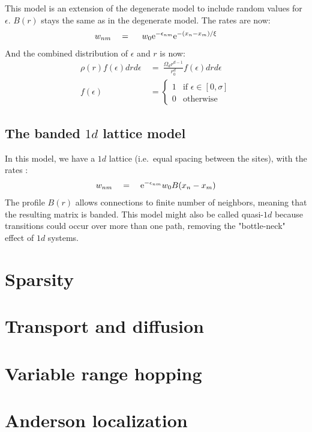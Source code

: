 This model is an extension of the degenerate model to include
random values for $\epsilon$. $B(r)$ stays the same as in the degenerate model.
The rates are now:
%
\begin{align}\label{eq:mott_hopping_rates}
w_{nm} \quad = \quad \ w_0 \mbox{e}^{-\epsilon_{nm}}\mbox{e}^{-(x_n-x_m)/\xi}
\end{align}
%
And the combined distribution of $\epsilon$ and $r$ is now:
%
\begin{align}\label{eq:mott_distribution}
\rho(r)f(\epsilon)drd\epsilon \ &=\ \frac{\Omega_d r^{d-1}}{r_0^d} f(\epsilon) dr d\epsilon \\
f(\epsilon)\ &= 
  \begin{cases} 
    1 &\textrm{if   } \epsilon \in [0,\sigma] \\
    0 &\textrm{otherwise}
  \end{cases}
\end{align}
%


\subsection{The banded $1d$ lattice model}

In this model, we have a $1d$ lattice (i.e.\ equal spacing between the sites), 
with the rates :
%
\begin{align}
w_{nm} \quad = \quad \mbox{e}^{-\epsilon_{nm}}w_0 B(x_n-x_m)
\end{align}
%
The profile $B(r)$ allows connections to finite number of neighbors,
meaning that the resulting matrix is banded. This model might also
be called quasi-$1d$ because transitions could occur over more
than one path, removing the "bottle-neck" effect of $1d$ systems.


\section{Sparsity}


\section{Transport and diffusion}


\section{Variable range hopping}


\section{Anderson localization}


